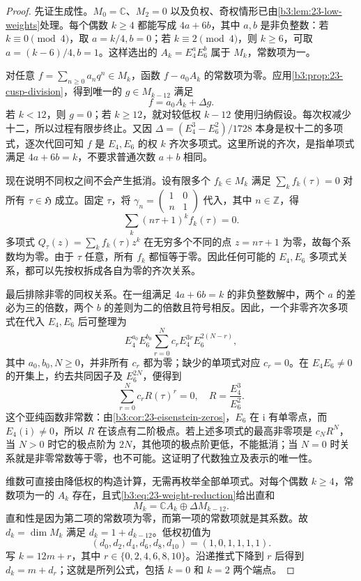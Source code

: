 \begin{proof}
先证生成性。\(M_0=\mathbb C\)、\(M_2=0\) 以及负权、奇权情形已由\cref{b3:lem:23-low-weights}处理。每个偶数 \(k\ge4\) 都能写成 \(4a+6b\)，其中 \(a,b\) 是非负整数：若 \(k\equiv0\pmod4\)，取 \(a=k/4,b=0\)；若 \(k\equiv2\pmod4\)，则 \(k\ge6\)，可取 \(a=(k-6)/4,b=1\)。这样选出的 \(A_k=E_4^aE_6^b\) 属于 \(M_k\)，常数项为一。

对任意 \(f=\sum_{n\ge0}a_nq^n\in M_k\)，函数 \(f-a_0A_k\) 的常数项为零。应用\cref{b3:prop:23-cusp-division}，得到唯一的 \(g\in M_{k-12}\) 满足
\begin{equation}\label{b3:eq:23-weight-reduction}
 f=a_0A_k+\Delta g.
\end{equation}
若 \(k<12\)，则 \(g=0\)；若 \(k\ge12\)，就对较低权 \(k-12\) 使用归纳假设。每次权减少十二，所以过程有限步终止。又因 \(\Delta=(E_4^3-E_6^2)/1728\) 本身是权十二的多项式，逐次代回可知 \(f\) 是 \(E_4,E_6\) 的权 \(k\) 齐次多项式。这里所说的齐次，是指单项式满足 \(4a+6b=k\)，不要求普通次数 \(a+b\) 相同。

现在说明不同权之间不会产生抵消。设有限多个 \(f_k\in M_k\) 满足 \(\sum_k f_k(\tau)=0\) 对所有 \(\tau\in\mathfrak H\) 成立。固定 \(\tau\)，将 \(\gamma_n=\left(\begin{smallmatrix}1&0\\n&1\end{smallmatrix}\right)\) 代入，其中 \(n\in\mathbb Z\)，得
\[
 \sum_k(n\tau+1)^k f_k(\tau)=0.
\]
多项式 \(Q_\tau(z)=\sum_k f_k(\tau)z^k\) 在无穷多个不同的点 \(z=n\tau+1\) 为零，故每个系数均为零。由于 \(\tau\) 任意，所有 \(f_k\) 都恒等于零。因此任何可能的 \(E_4,E_6\) 多项式关系，都可以先按权拆成各自为零的齐次关系。

最后排除非零的同权关系。在一组满足 \(4a+6b=k\) 的非负整数解中，两个 \(a\) 的差必为三的倍数，两个 \(b\) 的差则为二的倍数且符号相反。因此，一个非零齐次多项式在代入 \(E_4,E_6\) 后可整理为
\[
 E_4^{a_0}E_6^{b_0}
 \sum_{r=0}^N c_r E_4^{3r}E_6^{2(N-r)},
\]
其中 \(a_0,b_0,N\ge0\)，并非所有 \(c_r\) 都为零；缺少的单项式对应 \(c_r=0\)。在 \(E_4E_6\ne0\) 的开集上，约去共同因子及 \(E_6^{2N}\)，便得到
\[
 \sum_{r=0}^N c_r R(\tau)^r=0,\quad
 R=\frac{E_4^3}{E_6^2}.
\]
这个亚纯函数非常数：由\cref{b3:cor:23-eisenstein-zeros}，\(E_6\) 在 \(\mathrm{i}\) 有单零点，而 \(E_4(\mathrm{i})\ne0\)，所以 \(R\) 在该点有二阶极点。若上述多项式的最高非零项是 \(c_NR^N\)，当 \(N>0\) 时它的极点阶为 \(2N\)，其他项的极点阶更低，不能抵消；当 \(N=0\) 时关系就是非零常数等于零，也不可能。这证明了代数独立及表示的唯一性。

维数可直接由降低权的构造计算，无需再枚举全部单项式。对每个偶数 \(k\ge4\)，常数项为一的 \(A_k\) 存在，且式\eqref{b3:eq:23-weight-reduction}给出直和
\[
 M_k=\mathbb C A_k\oplus\Delta M_{k-12}.
\]
直和性是因为第二项的常数项为零，而第一项的常数项就是其系数。故 \(d_k=\dim M_k\) 满足 \(d_k=1+d_{k-12}\)。低权初值为
\[
 (d_0,d_2,d_4,d_6,d_8,d_{10})=(1,0,1,1,1,1).
\]
写 \(k=12m+r\)，其中 \(r\in\{0,2,4,6,8,10\}\)。沿递推式下降到 \(r\) 后得到 \(d_k=m+d_r\)；这就是所列公式，包括 \(k=0\) 和 \(k=2\) 两个端点。
\end{proof}

